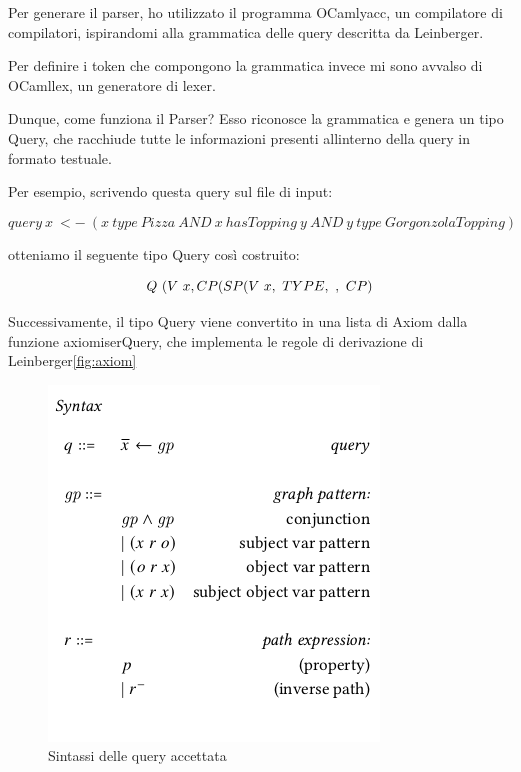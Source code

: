         Per generare il parser, ho utilizzato il programma OCamlyacc, un compilatore di compilatori, ispirandomi alla grammatica delle query descritta da Leinberger. %

        Per definire i token che compongono la grammatica invece mi sono avvalso di OCamllex, un generatore di lexer. 

        Dunque, come funziona il Parser? Esso riconosce la grammatica e genera un tipo Query, che racchiude tutte le informazioni presenti allinterno della query in formato testuale. 

        Per esempio, scrivendo questa query sul file di input: 
        
        $$ query \ x \ <- \ (x \ type \ Pizza \ AND \ x \ hasTopping \ y \ AND \ y \ type \ GorgonzolaTopping) $$
        
        otteniamo il seguente tipo Query così costruito: %

        $$ Q \  (V \ x, \\
            CP(SP(V \ x,\ TYPE, \ ,\ CP)$$

        Successivamente, il tipo Query viene convertito in una lista di Axiom dalla funzione axiomiserQuery, che implementa le regole di derivazione di Leinberger\ref{fig:axiom}

        \begin{figure}
            \centering
            \includegraphics[width=\textwidth]{pictures/leinbergSyntax.png}
            \caption{Sintassi delle query accettata}
            \label{fig:LeinbergerSyntax}
        \end{figure}

